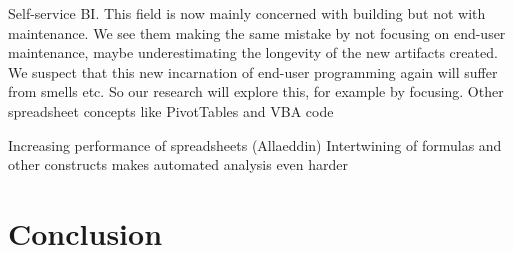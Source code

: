\documentclass[conference]{IEEEtran}
\begin{document}
  Self-service BI. This field is now mainly concerned with building but not with maintenance. We see them making the same mistake by not focusing on end-user maintenance, maybe underestimating the longevity of the new artifacts created. We suspect that this new incarnation of end-user programming again will suffer from smells etc. So our research will explore this, for example by focusing. Other spreadsheet concepts like PivotTables and VBA code
  

Increasing performance of spreadsheets (Allaeddin)
Intertwining of formulas and other constructs makes automated analysis even harder



\section{Conclusion}













\end{document}
